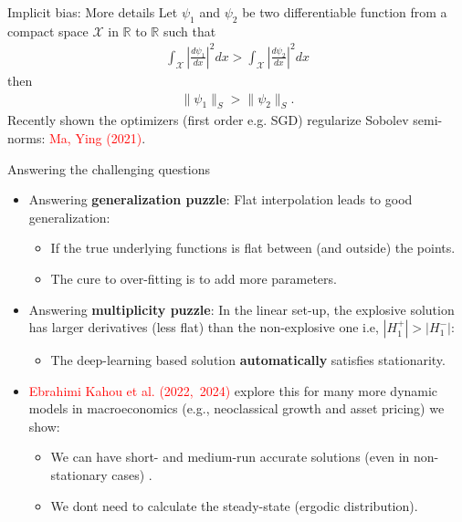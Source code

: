 \documentclass[aspectratio=169,10pt]{beamer}
\newcommand{\emphcolor}[1]{\textbf{\textcolor{emphcolorval}{#1}}}
\begin{document}
\begin{frame}{Implicit bias: More details}
	Let $\psi_1$ and $\psi_2$ be two differentiable function from a compact space $\mathcal{X}$ in $\mathbb{R}$ to $\mathbb{R}$ such that
	\begin{align*}
		\int_\mathcal{X}\left|\frac{d \psi_1}{dx}\right|^2 dx >   \int_\mathcal{X}\left|\frac{d \psi_2}{dx}\right|^2 dx
	\end{align*}
	then
	\begin{align*}
		\|\psi_1\|_S > \|\psi_2\|_S.
	\end{align*}
	Recently shown the optimizers (first order e.g. SGD) regularize Sobolev semi-norms: \textcolor{red}{Ma, Ying (2021)}.
\end{frame}


\begin{frame}{Answering the challenging questions}
	\begin{itemize}
		\item Answering \emphcolor{generalization puzzle}: Flat  interpolation leads to good generalization:\vspace{0.1in}
		\begin{itemize}
			\item If the true underlying functions is flat between (and outside) the points.\vspace{0.1in}
			\item The cure to over-fitting is to add more parameters.\vspace{0.1in}
		\end{itemize}
	 \item Answering \emphcolor{multiplicity puzzle}: In the linear set-up, the explosive solution has larger derivatives (less flat) than the non-explosive one i.e, $|H_1^+| > |H_1^-|$:\vspace{0.1in}
	 \begin{itemize}
	 	\item The deep-learning based solution \emphcolor{automatically} satisfies stationarity. \vspace{0.1in}
	 \end{itemize}
	\item \textcolor{red}{Ebrahimi Kahou et al. (2022,~2024)} explore this for many more dynamic models in macroeconomics (e.g., neoclassical growth and asset pricing) we show: \vspace{0.1in}
	\begin{itemize}
		\item We can have short- and medium-run accurate solutions (even in non-stationary cases) .\vspace{0.1in}
		\item  We dont need to calculate the steady-state (ergodic distribution).
	\end{itemize} 	
	\end{itemize}
	
\end{frame}				
\end{document}
